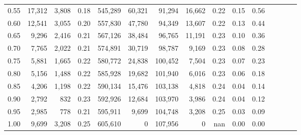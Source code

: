 \begin{tabular}{rrrcrrrrrrrrrrr}
0.55 &   17,312 &   3,808 &                                       0.18 &  545,289 &   60,321 &   91,294 &   16,662 &  0.22 &  0.15 &                         0.56 \\
0.60 &   12,541 &   3,055 &                                       0.20 &  557,830 &   47,780 &   94,349 &   13,607 &  0.22 &  0.13 &                         0.44 \\
0.65 &    9,296 &   2,416 &                                       0.21 &  567,126 &   38,484 &   96,765 &   11,191 &  0.23 &  0.10 &                         0.36 \\
0.70 &    7,765 &   2,022 &                                       0.21 &  574,891 &   30,719 &   98,787 &    9,169 &  0.23 &  0.08 &                         0.28 \\
0.75 &    5,881 &   1,665 &                                       0.22 &  580,772 &   24,838 &  100,452 &    7,504 &  0.23 &  0.07 &                         0.23 \\
0.80 &    5,156 &   1,488 &                                       0.22 &  585,928 &   19,682 &  101,940 &    6,016 &  0.23 &  0.06 &                         0.18 \\
0.85 &    4,206 &   1,198 &                                       0.22 &  590,134 &   15,476 &  103,138 &    4,818 &  0.24 &  0.04 &                         0.14 \\
0.90 &    2,792 &     832 &                                       0.23 &  592,926 &   12,684 &  103,970 &    3,986 &  0.24 &  0.04 &                         0.12 \\
0.95 &    2,985 &     778 &                                       0.21 &  595,911 &    9,699 &  104,748 &    3,208 &  0.25 &  0.03 &                         0.09 \\
1.00 &    9,699 &   3,208 &                                       0.25 &  605,610 &        0 &  107,956 &        0 &   nan &  0.00 &                         0.00 \\
\bottomrule
\end{tabular}
